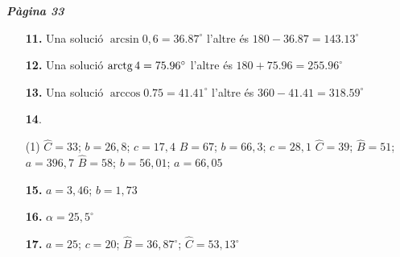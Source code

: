 \documentclass[a4paper, pdf, twoside]{book}
\begin{document}
\begin{multicols}{2}

{\textbf{\em Pàgina 33}} \hrulefill
\begin{enumerate}
\vspace{0.25cm}
\item[\fontfamily{phv}\selectfont\color{blue}\textbf{11. }] 
Una solució $\arcsin 0,6=36.87^\circ $ l'altre és $180-36.87 =143.13^\circ $
 \end{enumerate}
\begin{enumerate}
\vspace{0.25cm}
\item[\fontfamily{phv}\selectfont\color{blue}\textbf{12. }] 
Una solució $\mathrm{arctg}\, 4=75.96^\circ $ l'altre és $180+75.96 =255.96^\circ $
\vspace{0.25cm}
\item[\fontfamily{phv}\selectfont\color{blue}\textbf{13. }] 
Una solució $\arccos 0.75=41.41^\circ $ l'altre és $360-41.41 =318.59^\circ $
\vspace{0.25cm}



 \item[\fontfamily{phv}\selectfont\color{blue}\textbf{14}. ]  \scalebox{0.6}{\simbolclau } 
 \begin{tasks}[column-sep=1em, item-indent=1.3333em](1)
	 \task* $\hat C=33$; $b=26,8$; $c=17,4$
	 \task* $\hat B=67$; $b=66,3$; $c=28,1$
	 \task* $\hat C=39$; $\hat B=51$; $a=396,7$
	 \task* $\hat B=58$; $b=56,01$; $a=66,05$
\end{tasks}
\vspace{0.25cm}
\item[\fontfamily{phv}\selectfont\color{blue}\textbf{15. }]  \scalebox{0.6}{\simbolclau } 
$a=3,46$; $b=1,73$
\vspace{0.25cm}
\item[\fontfamily{phv}\selectfont\color{blue}\textbf{16. }]  \scalebox{0.6}{\simbolclau } 
$\alpha =25,5^\circ $
\vspace{0.25cm}
\item[\fontfamily{phv}\selectfont\color{blue}\textbf{17. }]  \scalebox{0.6}{\simbolclau } 
 $a=25$; $c=20$; $\hat B=36,87^\circ $; $\hat C=53,13^\circ $
 \end{enumerate}
\vspace{0.3cm}



\end{multicols}
\end{document}
